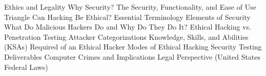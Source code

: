 Ethics and Legality
	Why Security?
	The Security, Functionality, and Ease of Use Triangle
	Can Hacking Be Ethical?
	Essential Terminology
	Elements of Security
	What Do Malicious Hackers Do and Why Do They Do It?
	Ethical Hacking vs. Penetration Testing
	Attacker Categorizations
	Knowledge, Skills, and Abilities (KSAs) Required of an Ethical Hacker
	Modes of Ethical Hacking
	Security Testing
	Deliverables
	Computer Crimes and Implications
	Legal Perspective (United States Federal Laws)